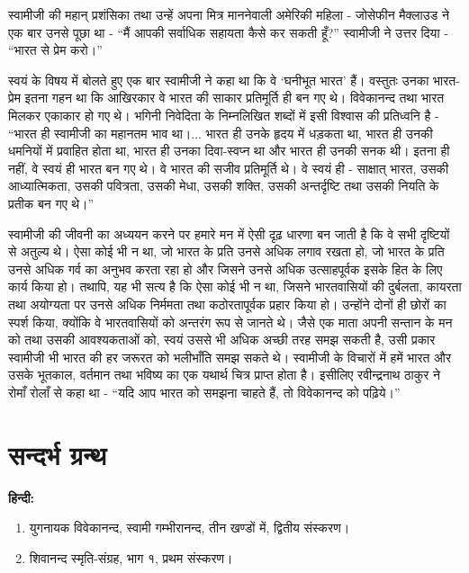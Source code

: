 \vskip -5pt

\delimiter

स्वामीजी की महान् प्रशंसिका तथा उन्हें अपना मित्र माननेवाली अमेरिकी महिला - जोसेफीन मैक्लाउड ने एक बार उनसे पूछा था - “मैं आपकी सर्वाधिक सहायता कैसे कर सकती हूँ?” स्वामीजी ने उत्तर दिया - “भारत से प्रेम करो।” 

\vskip -5pt

\delimiter

स्वयं के विषय में बोलते हुए एक बार स्वामीजी ने कहा था कि वे ‘घनीभूत भारत’ हैं। वस्तुतः उनका भारत-प्रेम इतना गहन था कि आखिरकार वे भारत की साकार प्रतिमूर्ति ही बन गए थे। विवेकानन्द तथा भारत मिलकर एकाकार हो गए थे। भगिनी निवेदिता के निम्नलिखित शब्दों में इसी विश्वास की प्रतिध्वनि है - “भारत ही स्वामीजी का महानतम भाव था।... भारत ही उनके हृदय में धड़कता था, भारत ही उनकी धमनियों में प्रवाहित होता था, भारत ही उनका दिवा-स्वप्न था और भारत ही उनकी सनक थी। इतना ही नहीं, वे स्वयं ही भारत बन गए थे। वे भारत की सजीव प्रतिमूर्ति थे। वे स्वयं ही - साक्षात् भारत, उसकी आध्यात्मिकता, उसकी पवित्रता, उसकी मेधा, उसकी शक्ति, उसकी अन्तर्दृष्टि तथा उसकी नियति के प्रतीक बन गए थे।” 

स्वामीजी की जीवनी का अध्ययन करने पर हमारे मन में ऐसी दृढ़ धारणा बन जाती है कि वे सभी दृष्टियों से अतुल्य थे। ऐसा कोई भी न था, जो भारत के प्रति उनसे अधिक लगाव रखता हो, जो भारत के प्रति उनसे अधिक गर्व का अनुभव करता रहा हो और जिसने उनसे अधिक उत्साहपूर्वक इसके हित के लिए कार्य किया हो। तथापि, यह भी सत्य है कि ऐसा कोई भी न था, जिसने भारतवासियों की दुर्बलता, कायरता तथा अयोग्यता पर उनसे अधिक निर्ममता तथा कठोरतापूर्वक प्रहार किया हो। उन्होंने दोनों ही छोरों का स्पर्श किया, क्योंकि वे भारतवासियों को अन्तरंग रूप से जानते थे। जैसे एक माता अपनी सन्तान के मन को तथा उसकी आवश्यकताओं को, स्वयं उससे भी अधिक अच्छी तरह समझ सकती है, उसी प्रकार स्वामीजी भी भारत की हर जरूरत को भलीभाँति समझ सकते थे। स्वामीजी के विचारों में हमें भारत और उसके भूतकाल, वर्तमान तथा भविष्य का एक यथार्थ चित्र प्राप्त होता है। इसीलिए रवीन्द्रनाथ ठाकुर ने रोमाँ रोलाँ से कहा था - “यदि आप भारत को समझना चाहते हैं, तो विवेकानन्द को पढ़िये।” 

\section*{सन्दर्भ ग्रन्थ }

\centerline{\textbf{हिन्दी: }}

\begin{enumerate}
\item युगनायक विवेकानन्द, स्वामी गम्भीरानन्द, तीन खण्डों में, द्वितीय संस्करण। 

 \item शिवानन्द स्मृति-संग्रह, भाग १, प्रथम संस्करण। 

\end{enumerate}

